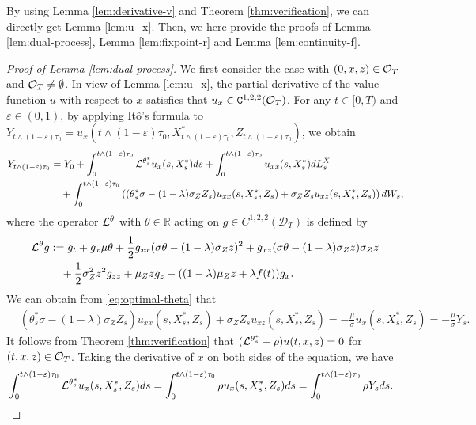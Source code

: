 \documentclass[11pt,times,letter]{article}
\newcommand{\R}{\mathds{R}}
\newcommand{\C}{{\tt{C}}}
\numberwithin{equation}{section}
\begin{document}
By using Lemma \ref{lem:derivative-v} and Theorem \ref{thm:verification}, we can directly get Lemma  \ref{lem:u_x}. Then, we here provide the proofs of Lemma \ref{lem:dual-process}, Lemma \ref{lem:fixpoint-r} and Lemma \ref{lem:continuity-f}.

\begin{proof}[Proof of Lemma \ref{lem:dual-process}]
We first consider the case with $(0,x,z)\in {\cal O}_T$ and ${\cal O}_T\neq \emptyset$. In view of Lemma \ref{lem:u_x}, the partial derivative of the value function $u$ with respect to $x$ satisfies that $u_x\in\C^{1,2,2}({\cal O}_T)$.  For any $t\in [0,T)$ and $\varepsilon\in(0,1)$, by applying It\^o's formula to $Y_{t\wedge (1-\varepsilon)\tau_0}=u_x({t\wedge (1-\varepsilon)\tau_0},X_{t\wedge (1-\varepsilon)\tau_0}^*,Z_{t\wedge (1-\varepsilon)\tau_0})$, we obtain
\begin{align}\label{eq:ito-Y-1}
Y_{t\wedge (1-\varepsilon)\tau_0}&=Y_0+\int_0^{{t\wedge (1-\varepsilon)\tau_0}} {\cal L}^{\theta_s^*} u_x(s,X_{s}^*)ds+\int_0^{{t\wedge (1-\varepsilon)\tau_0}}  u_{xx}(s,X_{s}^*)dL_s^X\nonumber\\
&\quad+\int_0^{{t\wedge (1-\varepsilon)\tau_0}} \left((\theta_s^*\sigma-(1-\lambda)\sigma_Z Z_s )u_{xx}(s,X_{s}^*,Z_s)+\sigma_Z Z_s u_{xz}(s,X_{s}^*,Z_s) \right) dW_s,
\end{align}
where the operator ${\cal L}^{\theta}$ with $\theta\in \R$ acting on %
$g\in C^{1,2,2}(\mathcal{D}_T)$ is defined by
\begin{align*}
{\cal L}^{\theta}g&:=g_t+g_x\mu\theta+\frac{1}{2}g_{xx}(\sigma\theta-(1-\lambda)\sigma_Zz)^2+g_{xz}(\sigma\theta-(1-\lambda)\sigma_Zz)\sigma_Z z\\
&\quad+\frac{1}{2}\sigma_Z^2z^2g_{zz}+\mu_Z zg_z -((1-\lambda)\mu_Zz+\lambda f(t)) g_x.
\end{align*} 
We can obtain from \eqref{eq:optimal-theta} that
\begin{align}\label{eq:ito-Y-2}
& (\theta_s^*\sigma-(1-\lambda)\sigma_Z Z_s )u_{xx}(s,X_{s}^*,Z_s)+\sigma_Z Z_s u_{xz}(s,X_{s}^*,Z_s) =- \frac{\mu}{\sigma} u_{x}(s,X_{s}^*,Z_s)=- \frac{\mu}{\sigma}Y_s.
\end{align}
It follows from Theorem \ref{thm:verification} that $({\cal L}^{\theta_s^*} -\rho)u(t,x,z)=0$ for $(t,x,z)\in  {\cal O}_T$. Taking the derivative of $x$ on both sides of the equation, we have
\begin{align}\label{eq:ito-Y-3}
&\int_0^{{t\wedge (1-\varepsilon)\tau_0}}  {\cal L}^{\theta_s^*} u_x(s,X_{s}^*,Z_s)ds=\int_0^{{t\wedge (1-\varepsilon)\tau_0}} \rho  u_x(s,X_{s}^*,Z_s)ds=\int_0^{{t\wedge (1-\varepsilon)\tau_0}}  \rho Y_sds.

\end{align}
\end{proof}
\end{document}
